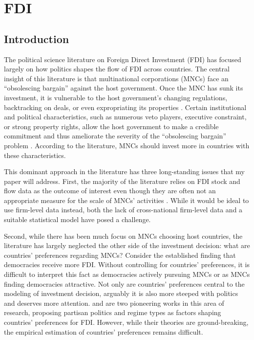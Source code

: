 \chapter{FDI}
\label{chap:FDI}

\section{Introduction}
\label{sec:introduction}

The political science literature on Foreign Direct Investment (FDI) has focused largely on how politics shapes the flow of FDI across countries. The central insight of this literature is that multinational corporations (MNCs) face an ``obsolescing bargain'' against the host government. Once the MNC has sunk its investment, it is vulnerable to the host government's changing regulations, backtracking on deals, or even expropriating its properties \citep{Li2009a, Sawant2010}. Certain institutional and political characteristics, such as numerous veto players, executive constraint, or strong property rights, allow the host government to make a credible commitment and thus ameliorate the severity of the ``obsolescing bargain'' problem \citep{Busse2007, Jensen2014, Li2003}. According to the literature, MNCs should invest more in countries with these characteristics.

This dominant approach in the literature has three long-standing issues that my paper will address. First, the majority of the literature relies on FDI stock and flow data as the outcome of interest even though they are often not an appropriate measure for the scale of MNCs' activities \citep{Kerner2014}. While it would be ideal to use firm-level data instead, both the lack of cross-national firm-level data and a suitable statistical model have posed a challenge.

Second, while there has been much focus on MNCs choosing host countries, the literature has largely neglected the other side of the investment decision: what are countries' preferences regarding MNCs? Consider the established finding that democracies receive more FDI. Without controlling for countries' preferences, it is difficult to interpret this fact as democracies actively pursuing MNCs or as MNCs finding democracies attractive. Not only are countries' preferences central to the modeling of investment decision, arguably it is also more steeped with politics and deserves more attention. \citet{Pinto2013} and \citet{Pandya2016} are two pioneering works in this area of research, proposing partisan politics and regime types as factors shaping countries' preferences for FDI. However, while their theories are ground-breaking, the empirical estimation of countries' preferences remains difficult.

